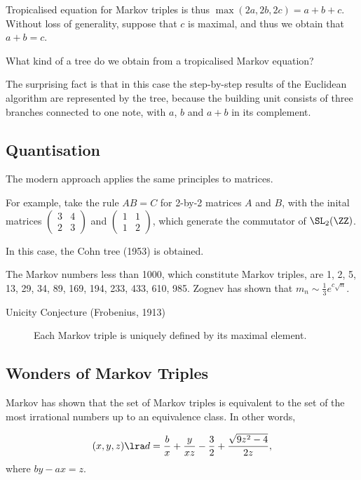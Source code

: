 \documentclass[11pt]{scrartcl}
\begin{document}
  Tropicalised equation for Markov triples is thus
  $\max(2a, 2b, 2c) = a+b+c$. Without loss of generality, suppose that
  $c$ is maximal, and thus we obtain that $a+b = c$.

  What kind of a tree do we obtain from a tropicalised Markov equation?

  The surprising fact is that in this case the step-by-step results of
  the Euclidean algorithm are represented by the tree, because the
  building unit consists of three branches connected to one note, with
  $a$, $b$ and $a+b$ in its complement.

  \subsection{Quantisation}

  The modern approach applies the same principles to matrices.

  For example, take the rule $AB = C$ for 2-by-2 matrices $A$ and $B$,
  with the inital matrices $\begin{pmatrix}
    3 & 4\\
    2 & 3
  \end{pmatrix}$ and $\begin{pmatrix}
    1 & 1\\
    1 & 2
  \end{pmatrix}$, which generate the commutator of $\SL_{2}(\ZZ)$.

  In this case, the Cohn tree (1953) is obtained.

  The Markov numbers less than 1000, which constitute Markov triples,
  are 1, 2, 5, 13, 29, 34, 89, 169, 194, 233, 433, 610, 985. Zognev
  has shown that $m_{n} \sim \frac{1}{3}e^{c \sqrt{n}}$.

  \begin{description}

  \item[Unicity Conjecture (Frobenius, 1913)]
    Each Markov triple is uniquely defined by its maximal element.
  \end{description}

  \subsection{Wonders of Markov Triples}
  Markov has shown that the set of Markov triples is equivalent to the
  set of the most irrational numbers up to an equivalence class. In
  other words,
  
  \begin{equation*}
    (x, y, z) \lra d = \frac{b}{x} + \frac{y}{xz} - \frac{3}{2} + \frac{\sqrt{9z^{2}-4}}{2z}, 
  \end{equation*}
  where $by - ax = z$.
\end{document}
